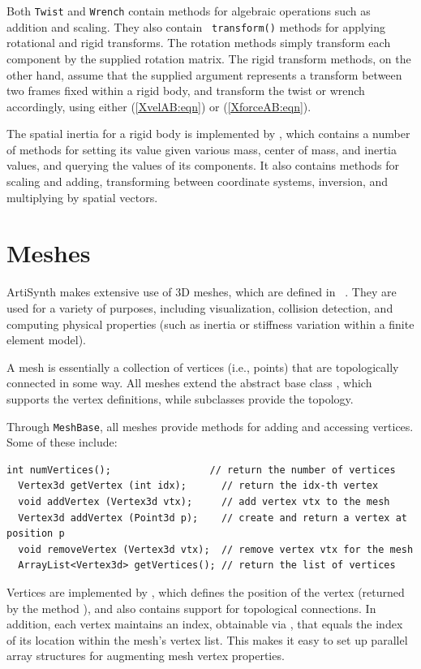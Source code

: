 Both {\tt Twist} and {\tt Wrench} contain methods for algebraic
operations such as addition and scaling. They also contain {\tt
transform()} methods for applying rotational and rigid transforms.
The rotation methods simply transform each component by the supplied
rotation matrix. The rigid transform methods, on the other hand,
assume that the supplied argument represents a transform between two
frames fixed within a rigid body, and transform the twist or wrench
accordingly, using either (\ref{XvelAB:eqn}) or (\ref{XforceAB:eqn}).

The spatial inertia for a rigid body is implemented by
, which contains a
number of methods for setting its value given various mass, center of
mass, and inertia values, and querying the values of its components.
It also contains methods for scaling and adding, transforming between
coordinate systems, inversion, and multiplying by spatial vectors.

\section{Meshes}
\label{Meshes:sec}

ArtiSynth makes extensive use of 3D meshes, which are defined in {\tt
\mgeo}.  They are used for a variety of purposes, including
visualization, collision detection, and computing physical properties
(such as inertia or stiffness variation within a finite element
model).

A mesh is essentially a collection of vertices
(i.e., points) that are topologically connected in some way.  All
meshes extend the abstract base class
, which supports the vertex
definitions, while subclasses provide the topology.

Through {\tt MeshBase}, all meshes provide methods for
adding and accessing vertices. Some of these include:
%
\begin{lstlisting}[]
  int numVertices();                 // return the number of vertices
  Vertex3d getVertex (int idx);      // return the idx-th vertex
  void addVertex (Vertex3d vtx);     // add vertex vtx to the mesh
  Vertex3d addVertex (Point3d p);    // create and return a vertex at position p
  void removeVertex (Vertex3d vtx);  // remove vertex vtx for the mesh
  ArrayList<Vertex3d> getVertices(); // return the list of vertices
\end{lstlisting}
%
Vertices are implemented by ,
which defines the position of the vertex (returned by the method
), and also
contains support for topological connections. In addition, each vertex
maintains an index, obtainable via
, that equals the
index of its location within the mesh's vertex list. This makes it
easy to set up parallel array structures for augmenting mesh vertex
properties.

